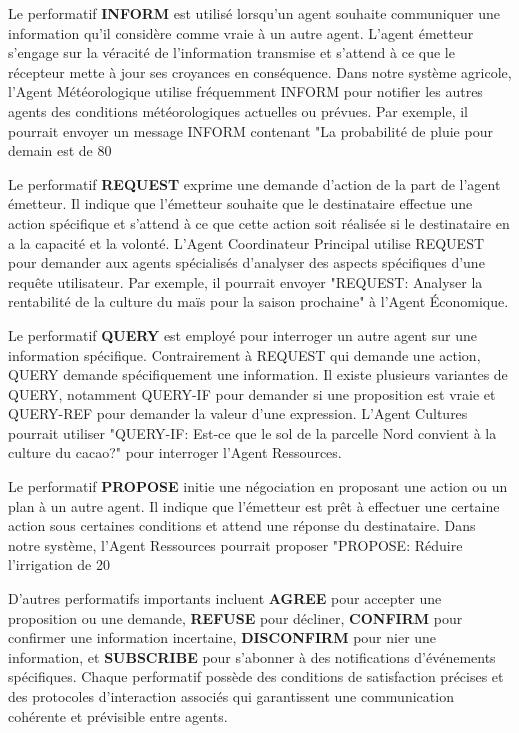 Le performatif \textbf{INFORM} est utilisé lorsqu'un agent souhaite communiquer une information qu'il considère comme vraie à un autre agent. L'agent émetteur s'engage sur la véracité de l'information transmise et s'attend à ce que le récepteur mette à jour ses croyances en conséquence. Dans notre système agricole, l'Agent Météorologique utilise fréquemment INFORM pour notifier les autres agents des conditions météorologiques actuelles ou prévues. Par exemple, il pourrait envoyer un message INFORM contenant "La probabilité de pluie pour demain est de 80%

Le performatif \textbf{REQUEST} exprime une demande d'action de la part de l'agent émetteur. Il indique que l'émetteur souhaite que le destinataire effectue une action spécifique et s'attend à ce que cette action soit réalisée si le destinataire en a la capacité et la volonté. L'Agent Coordinateur Principal utilise REQUEST pour demander aux agents spécialisés d'analyser des aspects spécifiques d'une requête utilisateur. Par exemple, il pourrait envoyer "REQUEST: Analyser la rentabilité de la culture du maïs pour la saison prochaine" à l'Agent Économique.

Le performatif \textbf{QUERY} est employé pour interroger un autre agent sur une information spécifique. Contrairement à REQUEST qui demande une action, QUERY demande spécifiquement une information. Il existe plusieurs variantes de QUERY, notamment QUERY-IF pour demander si une proposition est vraie et QUERY-REF pour demander la valeur d'une expression. L'Agent Cultures pourrait utiliser "QUERY-IF: Est-ce que le sol de la parcelle Nord convient à la culture du cacao?" pour interroger l'Agent Ressources.

Le performatif \textbf{PROPOSE} initie une négociation en proposant une action ou un plan à un autre agent. Il indique que l'émetteur est prêt à effectuer une certaine action sous certaines conditions et attend une réponse du destinataire. Dans notre système, l'Agent Ressources pourrait proposer "PROPOSE: Réduire l'irrigation de 20%

D'autres performatifs importants incluent \textbf{AGREE} pour accepter une proposition ou une demande, \textbf{REFUSE} pour décliner, \textbf{CONFIRM} pour confirmer une information incertaine, \textbf{DISCONFIRM} pour nier une information, et \textbf{SUBSCRIBE} pour s'abonner à des notifications d'événements spécifiques. Chaque performatif possède des conditions de satisfaction précises et des protocoles d'interaction associés qui garantissent une communication cohérente et prévisible entre agents.

